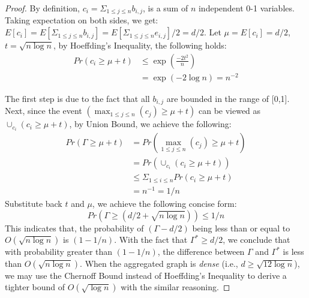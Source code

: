 \begin{proof}
By definition, $c_i = \Sigma_{1\leq j \leq n} b_{i,j}$, 
is a sum of $n$ independent 0-1 variables. Taking expectation on both sides, 
we get: $E[c_i] = E[\Sigma_{1\leq j \leq n} b_{i,j}]=E[\Sigma_{1\leq j \leq n} e_{i,j}]/2 = d/2$.
 Let $\mu =E[c_i] = d/2$, 
$t = \sqrt{n\log n}$, by Hoeffding's Inequality, the following holds:
\begin{equation*}
\begin{split}
	Pr(c_i \geq \mu + t) 
						&\leq \exp(\frac{-2t^2}{n}) \\
						&= \exp(-2\log n) = n^{-2}
\end{split}
\end{equation*}

The first step is due to the fact that all $b_{i,j}$ are bounded in the range of [0,1]. 
Next, since the event $(\max_{1 \leq j \leq n}(c_j) \geq \mu + t)$ can be viewed as
$\cup_{c_i} (c_i \geq \mu + t )$, by Union Bound, we achieve the following:
\begin{equation*}
\begin{split}
	Pr(\Gamma \geq \mu + t) &=Pr(\max_{1\leq j \leq n}(c_j) \geq \mu + t)  \\
		& = Pr(\cup_{c_i} (c_i \geq \mu + t )) \\
		&\leq \Sigma_{1 \leq i \leq n} Pr(c_i \geq \mu + t) \\
		& = n^{-1} = 1/n
\end{split}
\end{equation*}
Substitute back $t$ and $\mu$, we achieve the following concise form:
\begin{equation*}
	Pr(\Gamma \geq (d/2 + \sqrt{n\log n})) \leq 1/n
\end{equation*}
This indicates that, the probability of $(\Gamma-d/2)$ being less than or equal to $ O(\sqrt{n\log n})$ is $(1-1/n)$. 
With the fact that $\Gamma^* \geq d/2$, we conclude that
with probability greater than $(1-1/n)$, 
the difference between $\Gamma$ and $\Gamma^*$ is less than $O(\sqrt{n\log n})$.
When the aggregated graph is \emph{dense} (i.e., $d\geq \sqrt{12 \log n}$), we may use
the Chernoff Bound instead of Hoeffding's Inequality to derive a tighter bound of 
$O(\sqrt{\log n}) $ with the similar reasoning.
\end{proof}


